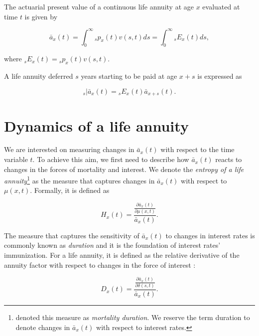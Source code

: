 \documentclass[12pt]{article}
\begin{document}
The actuarial present value of a continuous life annuity at age $x$ evaluated at time $t$ is given by

\begin{equation}\label{eq:Annuity}
\bar{a}_x(t) = \int_0^\infty {}_sp_x(t) {v}(s,t)ds = \int_0^\infty {}_sE_x(t) ds,
\end{equation}

where ${}_sE_x(t)={}_sp_x(t) {v}(s,t)$. 



A life annuity deferred $s$ years starting to be paid at age $x+s$ is expressed as


\begin{equation}\label{eq:DefAnnuity}
{}_s|\bar{a}_x(t) = {}_sE_x(t) \bar{a}_{x+s}(t).
\end{equation}


\section{Dynamics of a life annuity}


We are interested on measuring changes in $\bar{a}_x(t)$ with respect to the time variable $t$. To achieve this aim, we first need to describe how $\bar{a}_x(t)$ reacts to changes in the forces of mortality and interest. We denote the \textit{entropy of a life annuity}\footnote{\cite{Tsai2011,Tsai2013a,Lin2020} denoted this measure as \textit{mortality duration}. We reserve the term duration to denote changes in $\bar{a}_x(t)$ with respect to interest rates.} as the measure that captures changes in $\bar{a}_x(t)$ with respect to $\mu(x,t)$. Formally, it is defined as 

\begin{equation}\label{eq:EntropyGeneral}
{H}_{x}(t) = \frac{ \frac{\partial \bar{a}_x(t) }{\partial \mu(x,t)}}{\bar{a}_x(t)}.
\end{equation}

The measure that captures the sensitivity of $\bar{a}_x(t)$ to changes in interest rates is commonly known as \textit{duration} and it is the foundation of interest rates' immunization. For a life annuity, it is defined as the relative derivative of the annuity factor with respect to changes in the force of interest \citep{Milevsky2012,Milevsky2012a}:


\begin{equation}\label{eq:DurationGeneral}
{D}_{x}(t) = \frac{ \frac{\partial \bar{a}_x(t) }{\partial \delta(s,t)}}{\bar{a}_x(t)}.
\end{equation}
\end{document}
